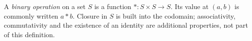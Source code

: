 
A \emph{binary operation} on a set $S$ is a function $\ast:S\times S\to S$. Its value at $(a,b)$ is commonly written $a\ast b$. Closure in $S$ is built into the codomain; associativity, commutativity and the existence of an identity are additional properties, not part of this definition.
